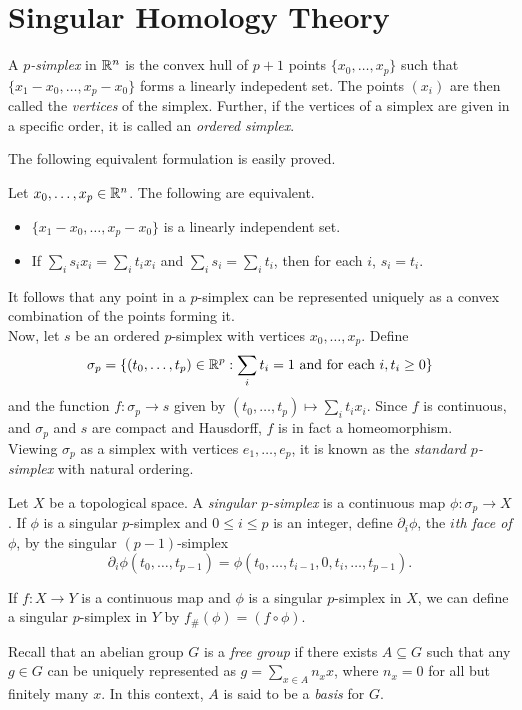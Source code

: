 \section{Singular Homology Theory}

\begin{definition}
	A \textit{$p$-simplex} in $\mathbb{R}^n$ is the convex hull of $p+1$ points $\{x_0,\ldots,x_p\}$ such that $\{x_1-x_0,\ldots,x_p-x_0\}$ forms a linearly indepedent set. The points $(x_i)$ are then called the \textit{vertices} of the simplex. Further, if the vertices of a simplex are given in a specific order, it is called an \textit{ordered simplex}.
\end{definition}

The following equivalent formulation is easily proved.

\begin{lemma}
	Let $x_0,\ldots,x_p\in\mathbb{R}^n$. The following are equivalent.
	\begin{itemize}
		\item $\{x_1-x_0,\ldots,x_p-x_0\}$ is a linearly independent set.
		\item If $\sum_i s_i x_i = \sum_i t_i x_i$ and $\sum_i s_i = \sum_i t_i$, then for each $i$, $s_i=t_i$.
	\end{itemize}
\end{lemma}

It follows that any point in a $p$-simplex can be represented uniquely as a convex combination of the points forming it.\\
Now, let $s$ be an ordered $p$-simplex with vertices $x_0,\ldots,x_p$. Define
\[ \sigma_p = \{(t_0,\ldots,t_p)\in\mathbb{R}^p : \sum_i t_i = 1 \text{ and for each }i, t_i\geq 0\} \]
and the function $f:\sigma_p\to s$ given by $(t_0,\ldots,t_p)\mapsto \sum_i t_i x_i$. Since $f$ is continuous, and $\sigma_p$ and $s$ are compact and Hausdorff, $f$ is in fact a homeomorphism.\\
Viewing $\sigma_p$ as a simplex with vertices $e_1,\ldots,e_p$, it is known as the \textit{standard $p$-simplex} with natural ordering.

\begin{definition}
	Let $X$ be a topological space. A \textit{singular $p$-simplex} is a continuous map $\phi:\sigma_p\to X$. If $\phi$ is a singular $p$-simplex and $0\leq i\leq p$ is an integer, define $\partial_i\phi$, the \textit{$i$th face of $\phi$}, by the singular $(p-1)$-simplex
	\[ \partial_i\phi(t_0,\ldots,t_{p-1}) = \phi(t_0,\ldots,t_{i-1},0,t_i,\ldots,t_{p-1}). \]
\end{definition}

If $f:X\to Y$ is a continuous map and $\phi$ is a singular $p$-simplex in $X$, we can define a singular $p$-simplex in $Y$ by $f_{\#}(\phi) = (f\circ\phi)$.

Recall that an abelian group $G$ is a \textit{free group} if there exists $A\subseteq G$ such that any $g\in G$ can be uniquely represented as $g = \sum_{x\in A} n_x x$, where $n_x=0$ for all but finitely many $x$. In this context, $A$ is said to be a \textit{basis} for $G$.